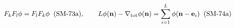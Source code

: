 \documentclass[preview]{standalone}
\begin{document}
\begin{align*}
\special{dvisvgm:raw <g id='unique000'>}F_k F_l \phi = F_l F_k \phi\;\;(\text{SM-73a}), \qquad L\phi(\mathbf{n}) - \nabla_{\mathrm{tot}}\phi(\mathbf{n}) = \sum_{i=1}^L \phi(\mathbf{n}-\mathbf{e}_i)\;\;(\text{SM-74a})\special{dvisvgm:raw </g>}
\end{align*}
\end{document}
